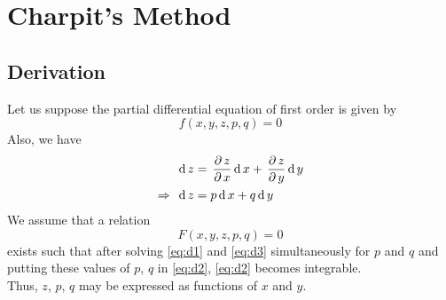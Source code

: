 \documentclass[../main-sheet.tex]{subfiles}
\begin{document}
\chapter{Charpit's Method}
\section{Derivation}
Let us suppose the partial differential equation of first order is given by
\begin{equation}
    f(x,y,z,p,q)=0\label{eq:d1}
\end{equation}
Also, we have
\begin{align}
    \,\mathrm{d}\, z&=\,\frac{\partial\, z}{\partial\, x}\,\mathrm{d}\, x+\,\frac{\partial\, z}{\partial\, y}\,\mathrm{d}\, y\notag\\
    \Rightarrow\;\,\mathrm{d}\, z&=p\,\mathrm{d}\, x+q\,\mathrm{d}\, y\label{eq:d2}
\end{align}
We assume that a relation
\begin{equation}
    F(x,y,z,p,q)=0\label{eq:d3}
\end{equation}
exists such that after solving \eqref{eq:d1} and \eqref{eq:d3} simultaneously for \(p\) and \(q\) and putting these values of \(p\), \(q\) in \eqref{eq:d2}, \eqref{eq:d2} becomes integrable.\\
Thus, \(z\), \(p\), \(q\) may be expressed as functions of \(x\) and \(y\).
\end{document}
